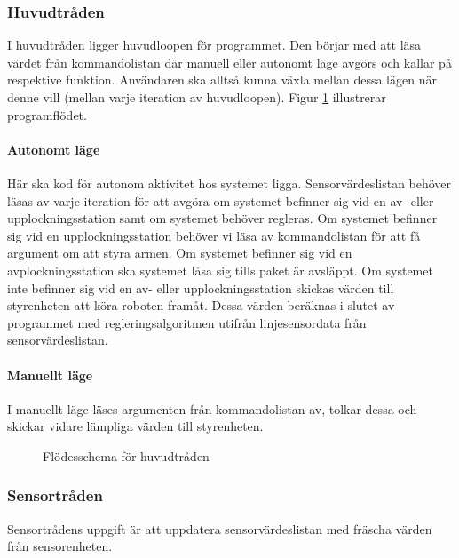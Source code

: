 \subsubsection{Huvudtråden}
I huvudtråden ligger huvudloopen för programmet. Den börjar med att läsa värdet från kommandolistan där manuell eller autonomt läge avgörs och kallar på respektive funktion. Användaren ska alltså kunna växla mellan dessa lägen när denne vill (mellan varje iteration av huvudloopen). Figur \ref{designspec:huvudmodul-huvudtrad} illustrerar programflödet.
\paragraph{Autonomt läge}
\leavevmode
\newline
\newline
Här ska kod för autonom aktivitet hos systemet ligga. Sensorvärdeslistan behöver läsas av varje iteration för att avgöra om systemet befinner sig vid en av- eller upplockningsstation samt om systemet behöver regleras. Om systemet befinner sig vid en upplockningsstation behöver vi läsa av kommandolistan för att få argument om att styra armen. Om systemet befinner sig vid en avplockningsstation ska systemet låsa sig tills paket är avsläppt.
\newline 
Om systemet inte befinner sig vid en av- eller upplockningsstation skickas värden till styrenheten att köra roboten framåt. Dessa värden beräknas i slutet av programmet med regleringsalgoritmen utifrån linjesensordata från sensorvärdeslistan. 
\paragraph{Manuellt läge}
\leavevmode
\newline
\newline
I manuellt läge läses argumenten från kommandolistan av, tolkar dessa och skickar vidare lämpliga värden till styrenheten.

\begin{figure}[h]
\centering
\scalebox{0.6}{}
\caption{Flödesschema för huvudtråden} \label{designspec:huvudmodul-huvudtrad}
\end{figure}

\subsubsection{Sensortråden}
Sensortrådens uppgift är att uppdatera sensorvärdeslistan med fräscha värden från sensorenheten.

